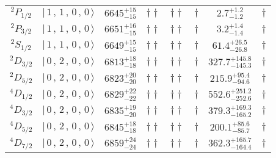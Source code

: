 \begin{tabular}{c| c c c c c c c}
$^{2}P_{1/2}$ & $\vert \,1\,,\,1\,,\,0\,,\,0 \,\rangle $ & $6645^{+15}_{-15}$ & $\dagger\dagger$ & $\dagger\dagger$ & $\dagger$ & $2.7^{+1.2}_{-1.2}$ & $\dagger$ \\ 
$^{2}P_{3/2}$ & $\vert \,1\,,\,1\,,\,0\,,\,0 \,\rangle $ & $6651^{+16}_{-15}$ & $\dagger\dagger$ & $\dagger\dagger$ & $\dagger$ & $3.2^{+1.4}_{-1.4}$ & $\dagger$ \\ 
$^{2}S_{1/2}$ & $\vert \,1\,,\,1\,,\,0\,,\,0 \,\rangle $ & $6649^{+15}_{-15}$ & $\dagger\dagger$ & $\dagger\dagger$ & $\dagger$ & $61.4^{+26.5}_{-26.8}$ & $\dagger$ \\ 
$^{2}D_{3/2}$ & $\vert \,0\,,\,2\,,\,0\,,\,0 \,\rangle $ & $6813^{+18}_{-18}$ & $\dagger\dagger$ & $\dagger\dagger$ & $\dagger$ & $327.7^{+145.8}_{-145.3}$ & $\dagger$ \\ 
$^{2}D_{5/2}$ & $\vert \,0\,,\,2\,,\,0\,,\,0 \,\rangle $ & $6823^{+20}_{-20}$ & $\dagger\dagger$ & $\dagger\dagger$ & $\dagger$ & $215.9^{+95.4}_{-94.6}$ & $\dagger$ \\ 
$^{4}D_{1/2}$ & $\vert \,0\,,\,2\,,\,0\,,\,0 \,\rangle $ & $6829^{+22}_{-22}$ & $\dagger\dagger$ & $\dagger\dagger$ & $\dagger$ & $552.6^{+251.2}_{-252.6}$ & $\dagger$ \\ 
$^{4}D_{3/2}$ & $\vert \,0\,,\,2\,,\,0\,,\,0 \,\rangle $ & $6835^{+19}_{-20}$ & $\dagger\dagger$ & $\dagger\dagger$ & $\dagger$ & $379.3^{+169.3}_{-165.2}$ & $\dagger$ \\ 
$^{4}D_{5/2}$ & $\vert \,0\,,\,2\,,\,0\,,\,0 \,\rangle $ & $6845^{+18}_{-18}$ & $\dagger\dagger$ & $\dagger\dagger$ & $\dagger$ & $200.1^{+85.6}_{-85.7}$ & $\dagger$ \\ 
$^{4}D_{7/2}$ & $\vert \,0\,,\,2\,,\,0\,,\,0 \,\rangle $ & $6859^{+24}_{-24}$ & $\dagger\dagger$ & $\dagger\dagger$ & $\dagger$ & $362.3^{+165.7}_{-164.4}$ & $\dagger$ \\ 
\hline \hline
\end{tabular}
